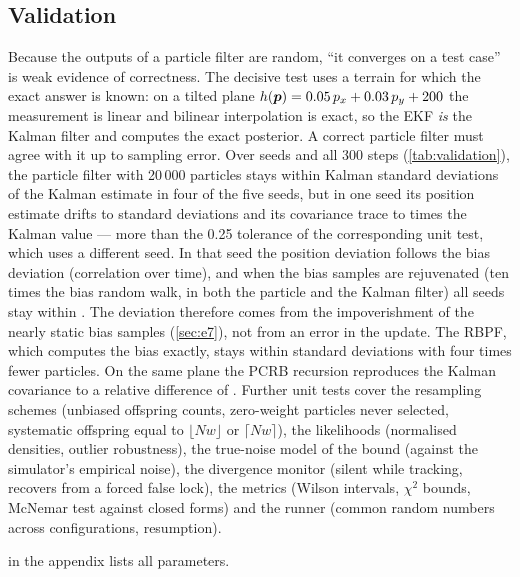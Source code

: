 \begin{table}[t]
  \centering\small
  \caption{Runtime per filter step (median of \RtReps{} repetitions of a 300-step flight on the
    hill-country DEM, single process, one performance core of the machine in
    \cref{app:repro}).}\label{tab:runtime}
  
\end{table}

\subsection{Validation}\label{sec:validation}
Because the outputs of a particle filter are random, ``it converges on a test case'' is weak
evidence of correctness. The decisive test uses a terrain for which the exact answer is known: on
a tilted plane $h(\bm{p}) = 0.05\,p_x + 0.03\,p_y + 200$ the measurement is linear and bilinear
interpolation is exact, so the EKF \emph{is} the Kalman filter and computes the exact posterior.
A correct particle filter must agree with it up to sampling error. Over \ValSeeds{} seeds and
all 300 steps (\cref{tab:validation}), the particle filter with 20\,000 particles stays within
\ValPFPosSecond{} Kalman standard deviations of the Kalman estimate in four of the five seeds, but
in one seed its position estimate drifts to \ValPFPosMax{} standard deviations and its covariance
trace to \ValPFTraceLo{} times the Kalman value --- more than the 0.25 tolerance of the
corresponding unit test, which uses a different seed. In that seed the position deviation follows
the bias deviation (correlation \ValPFWorstSeedCorr{} over time), and when the bias samples are
rejuvenated (ten times the bias random walk, in both the particle and the Kalman filter) all seeds
stay within \ValPFRejuvenatedPosMax. The deviation therefore comes from the impoverishment of the
nearly static bias samples (\cref{sec:e7}), not from an error in the update. The RBPF, which
computes the bias exactly, stays within \ValRBPFPosMax{} standard deviations with four times fewer
particles. On the same plane the PCRB recursion reproduces the Kalman
covariance to a relative difference of \ValPcrbRelDiff{}. Further unit tests cover the resampling
schemes (unbiased offspring counts, zero-weight particles never selected, systematic offspring
equal to $\lfloor N w\rfloor$ or $\lceil N w \rceil$), the likelihoods (normalised densities,
outlier robustness), the true-noise model of the bound (against the simulator's empirical noise),
the divergence monitor (silent while tracking, recovers from a forced false lock), the metrics
(Wilson intervals, $\chi^2$ bounds, McNemar test against closed forms) and the runner (common
random numbers across configurations, resumption).

\begin{table}[t]
  \centering\small
  \caption{Particle filters against the exact Kalman filter on planar terrain ($\sigma_0 =
    100$\,m, \ValSeeds{} seeds, worst case over the 300-step flight).}\label{tab:validation}
  
\end{table}

 in the appendix lists all parameters.
